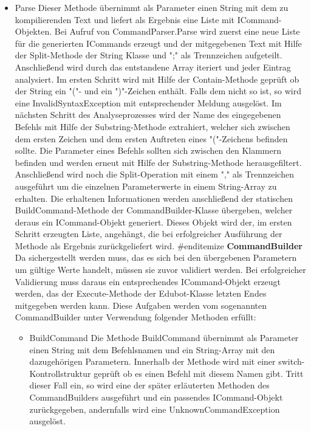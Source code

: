 \begin{itemize}
\item Parse
Dieser Methode übernimmt als Parameter einen String mit dem zu kompilierenden Text und liefert als Ergebnis eine Liste mit ICommand-Objekten. 
Bei Aufruf von CommandParser.Parse wird zuerst eine neue Liste für die generierten ICommands erzeugt und der mitgegebenen Text mit Hilfe der Split-Methode der String Klasse und ";" als Trennzeichen aufgeteilt. Anschließend wird durch das entstandene Array iteriert und jeder Eintrag analysiert. Im ersten Schritt wird mit Hilfe der Contain-Methode geprüft ob der String ein "("- und ein ")"-Zeichen enthält. Falls dem nicht so ist, so wird eine InvalidSyntaxException mit entsprechender Meldung ausgelöst.
Im nächsten Schritt des Analyseprozesses wird der Name des eingegebenen Befehls mit Hilfe der Substring-Methode extrahiert, welcher sich zwischen dem ersten Zeichen und dem ersten Auftreten eines "("-Zeichens befinden sollte. Die Parameter eines Befehls sollten sich zwischen den Klammern befinden und werden erneut mit Hilfe der Substring-Methode herausgefiltert. Anschließend wird noch die Split-Operation mit einem "," als Trennzeichen ausgeführt um die einzelnen Parameterwerte in einem String-Array zu erhalten. 
Die erhaltenen Informationen werden anschließend der statischen BuildCommand-Methode der CommandBuilder-Klasse übergeben, welcher deraus ein ICommand-Objekt generiert. Dieses Objekt wird der, im ersten Schritt erzeugten Liste, angehängt, die bei erfolgreicher Ausführung der Methode als Ergebnis zurückgeliefert wird.
#end{itemize}
\textbf{CommandBuilder}
Da sichergestellt werden muss, das es sich bei den übergebenen Parametern um gültige Werte handelt, müssen sie zuvor validiert werden. Bei erfolgreicher Validierung muss daraus ein entsprechendes ICommand-Objekt erzeugt werden, das der Execute-Methode der Edubot-Klasse letzten Endes mitgegeben werden kann. Diese Aufgaben werden vom sogenannten CommandBuilder unter Verwendung folgender Methoden erfüllt:
\begin{itemize}
\item BuildCommand
Die Methode BuildCommand übernimmt als Parameter einen String mit dem Befehlsnamen und ein String-Array mit den dazugehörigen Parametern. Innerhalb der Methode wird mit einer switch-Kontrollstruktur geprüft ob es einen Befehl mit diesem Namen gibt. Tritt dieser Fall ein, so wird eine der später erläuterten Methoden des CommandBuilders ausgeführt und ein passendes ICommand-Objekt zurückgegeben, andernfalls wird eine UnknownCommandException ausgelöst. 

\end{itemize}
\end{itemize}
